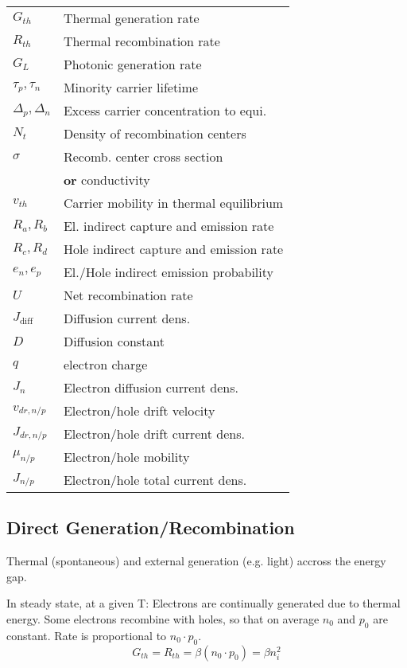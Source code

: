 \documentclass[a4paper, fontsize=8pt, landscape, DIV=1]{scrartcl}
\begin{document}
\begin{multicols*}{4}
    \begin{tabular}[h]{l l}
      $G_{th}$   & Thermal generation rate \\
      $R_{th}$   & Thermal recombination rate \\
      $G_{L}$    & Photonic generation rate \\
      $\tau_p, \tau_n$   & Minority carrier lifetime \\
      $\Delta_p, \Delta_n$   & Excess carrier concentration to equi. \\
      $N_t$    & Density of recombination centers \\
      $\sigma$    & Recomb. center cross section \\
      {}    & \textbf{or} conductivity \\
      $v_{th}$    & Carrier mobility in thermal equilibrium \\
      $R_a,R_b$    & El. indirect capture and emission rate \\
      $R_c,R_d$    & Hole indirect capture and emission rate \\
      $e_n,e_p$    & El./Hole indirect emission probability \\
      $U$    & Net recombination rate \\
      $J_{\text{diff}}$ & Diffusion current dens. \\
      $D$ & Diffusion constant \\
      $q$ & electron charge \\
      $J_n$ & Electron diffusion current dens.\\
      $v_{dr,n/p}$ & Electron/hole drift velocity \\
      $J_{dr,n/p}$ & Electron/hole drift current dens.\\
      $\mu_{n/p}$ & Electron/hole mobility \\
      $J_{n/p}$ & Electron/hole total current dens. \\
    \end{tabular}

  \subsection{Direct Generation/Recombination}
    Thermal (spontaneous) and external generation (e.g. light) accross the energy gap.

    In steady state, at a given T: Electrons are continually generated due to thermal energy.
    Some electrons recombine with holes, so that on average $n_0$ and $p_0$ are constant. 
    Rate is proportional to $n_0 \cdot p_0$. 
    \[G_{th} = R_{th} = \beta(n_0 \cdot p_0) = \beta n_i^2\]


\end{multicols*}
\end{document}
